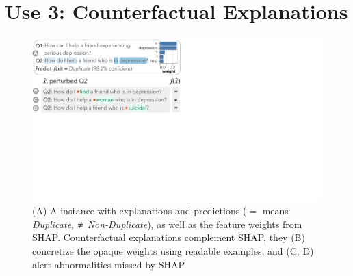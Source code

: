 
\newcommand{\fwone}[1]{\colbox{cfwone}{#1}\xspace}
\newcommand{\fwtwo}[1]{\colbox{cfwtwo}{#1}\xspace}
\newcommand{\fwthree}[1]{\colbox{cfwthree}{#1}\xspace}
\newcommand{\fwfour}[1]{\colbox{cfwfour}{#1}\xspace}

\newcommand{\fexp}[2]{\texttt{[{\color{darkgray}{#1:#2}}]}\xspace}
\newcommand{\fexptag}[1]{\fexp{TAG}{#1}}
\newcommand{\fexpfrom}[1]{\fexp{FROM}{#1}}
\newcommand{\fexpto}[1]{\fexp{TO}{#1}}
\newcommand{\fexptemp}[1]{\fexp{TEMP}{#1}}


\section{Use 3: Counterfactual Explanations}
\label{sec:app_explain}







\begin{figure}[t]
\centering
\includegraphics[trim={0 20cm 33cm 0cm},clip,width=1\columnwidth]{figures/explanation_v2.pdf}
\vspace{-15pt}
\caption{
(A) A \qqp instance with explanations and predictions ($\mathbf{=}$ means \emph{Duplicate}, $\mathbf{\not\eq}$ \emph{Non-Duplicate}), as well as the feature weights from SHAP.
Counterfactual explanations complement SHAP, \ie they (B) concretize the opaque weights using readable examples, and (C, D) alert abnormalities missed by SHAP.
}
\vspace{-10pt}
\label{fig:explanation}
\end{figure}

